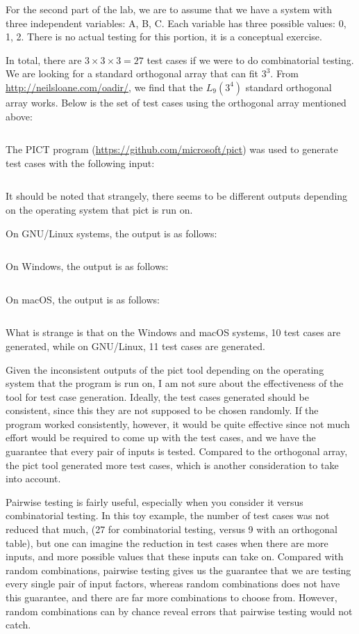 For the second part of the lab, we are to assume that we have a system with
three independent variables: A, B, C. Each variable has three possible values:
0, 1, 2. There is no actual testing for this portion, it is a conceptual
exercise.

In total, there are $3 \times 3 \times 3  = 27$ test cases if we were to do
combinatorial testing. We are looking for a standard orthogonal array that
can fit $3^3$. From \url{http://neilsloane.com/oadir/}, we find that
the $L_9(3^4)$ standard orthogonal array works. 
Below is the set of test cases using the orthogonal array mentioned above:

\inputminted{text}{resources/standard3^4}

The PICT program (\url{https://github.com/microsoft/pict}) was used to generate
test cases with the following input:

\inputminted{text}{resources/pict}

It should be noted that strangely, there seems to be different outputs
depending on the operating system that pict is run on.

On GNU/Linux systems, the output is as follows:
\inputminted{text}{resources/pictlinux}

On Windows, the output is as follows:
\inputminted{text}{resources/pictwindoze}

On macOS, the output is as follows:
\inputminted{text}{resources/pictmacos}

What is strange is that on the Windows and macOS systems, 10 test cases are
generated, while on GNU/Linux, 11 test cases are generated. 

Given the inconsistent outputs of the pict tool depending on the operating
system that the program is run on, I am not sure about the effectiveness of the
tool for test case generation. Ideally, the test cases generated should be
consistent, since this they are not supposed to be chosen randomly. If the
program worked consistently, however, it would be quite effective since not
much effort would be required to come up with the test cases, and we have the
guarantee that every pair of inputs is tested. 
Compared to the orthogonal array, the pict tool generated more test cases,
which is another consideration to take into account. 


Pairwise testing is fairly useful, especially when you consider it versus
combinatorial testing. In this toy example, the number of test cases was not
reduced that much, (27 for combinatorial testing, versus 9 with an orthogonal
table), but one can imagine the reduction in test cases when there are more
inputs, and more possible values that these inputs can take on. Compared with
random combinations, pairwise testing gives us the guarantee that we are
testing every single pair of input factors, whereas random combinations
does not have this guarantee, and there are far more combinations to choose
from. However, random combinations can by chance reveal errors that pairwise
testing would not catch.

